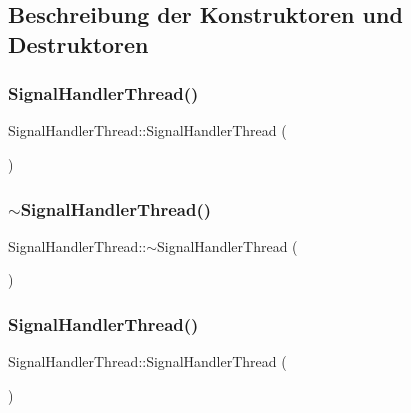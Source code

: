 \subsection{Beschreibung der Konstruktoren und Destruktoren}
\hypertarget{class_signal_handler_thread_ab78029caf852fcaa1d4c1d22ae1432fd}{}\label{class_signal_handler_thread_ab78029caf852fcaa1d4c1d22ae1432fd} 
\subsubsection{\texorpdfstring{Signal\+Handler\+Thread()}{SignalHandlerThread()}\hspace{0.1cm}{\footnotesize\ttfamily [1/2]}}
{\footnotesize\ttfamily Signal\+Handler\+Thread\+::\+Signal\+Handler\+Thread (\begin{DoxyParamCaption}{ }\end{DoxyParamCaption})}

\hypertarget{class_signal_handler_thread_a414c6ca3b03db6f0fa9bf24957421bf4}{}\label{class_signal_handler_thread_a414c6ca3b03db6f0fa9bf24957421bf4} 
\subsubsection{\texorpdfstring{$\sim$\+Signal\+Handler\+Thread()}{~SignalHandlerThread()}\hspace{0.1cm}{\footnotesize\ttfamily [1/2]}}
{\footnotesize\ttfamily Signal\+Handler\+Thread\+::$\sim$\+Signal\+Handler\+Thread (\begin{DoxyParamCaption}{ }\end{DoxyParamCaption})\hspace{0.3cm}{\ttfamily [virtual]}}

\hypertarget{class_signal_handler_thread_ab78029caf852fcaa1d4c1d22ae1432fd}{}\label{class_signal_handler_thread_ab78029caf852fcaa1d4c1d22ae1432fd} 
\subsubsection{\texorpdfstring{Signal\+Handler\+Thread()}{SignalHandlerThread()}\hspace{0.1cm}{\footnotesize\ttfamily [2/2]}}
{\footnotesize\ttfamily Signal\+Handler\+Thread\+::\+Signal\+Handler\+Thread (\begin{DoxyParamCaption}{ }\end{DoxyParamCaption})}

